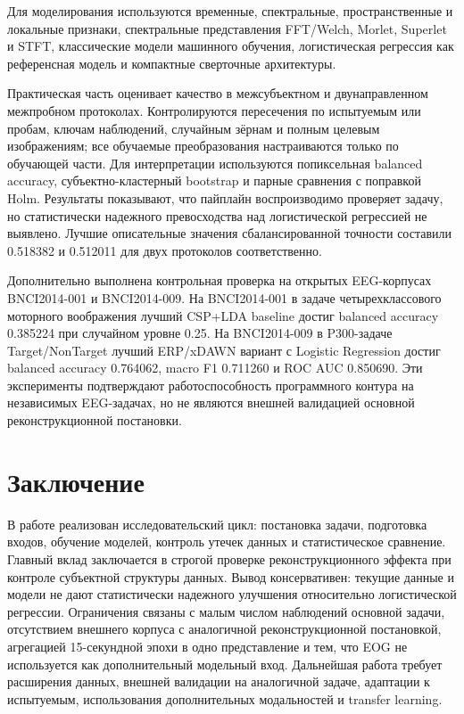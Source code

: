 \documentclass[
    14pt,
    candidate,
    times
]{disser}
\begin{document}
Для моделирования используются временные, спектральные, пространственные и
локальные признаки, спектральные представления FFT/Welch, Morlet, Superlet и
STFT, классические модели машинного обучения, логистическая регрессия как
референсная модель и компактные сверточные архитектуры.

Практическая часть оценивает качество в межсубъектном и двунаправленном
межпробном протоколах. Контролируются пересечения по испытуемым или пробам,
ключам наблюдений, случайным зёрнам и полным целевым изображениям; все
обучаемые преобразования настраиваются только по обучающей части. Для
интерпретации используются попиксельная balanced accuracy,
субъектно-кластерный bootstrap и парные сравнения с поправкой Holm. Результаты
показывают, что пайплайн воспроизводимо проверяет задачу, но статистически
надежного превосходства над логистической регрессией не выявлено. Лучшие
описательные значения сбалансированной точности составили 0.518382 и 0.512011
для двух протоколов соответственно.

Дополнительно выполнена контрольная проверка на открытых EEG-корпусах
BNCI2014-001 и BNCI2014-009. На BNCI2014-001 в задаче четырехклассового
моторного воображения лучший CSP+LDA baseline достиг balanced accuracy
0.385224 при случайном уровне 0.25. На BNCI2014-009 в P300-задаче
Target/NonTarget лучший ERP/xDAWN вариант с Logistic Regression достиг
balanced accuracy 0.764062, macro F1 0.711260 и ROC AUC 0.850690. Эти
эксперименты подтверждают работоспособность программного контура на
независимых EEG-задачах, но не являются внешней валидацией основной
реконструкционной постановки.

\section*{Заключение}

В работе реализован исследовательский цикл: постановка задачи, подготовка
входов, обучение моделей, контроль утечек данных и статистическое сравнение.
Главный вклад заключается в строгой проверке реконструкционного эффекта при
контроле субъектной структуры данных. Вывод консервативен: текущие данные и
модели не дают статистически надежного улучшения относительно логистической
регрессии. Ограничения связаны с малым числом наблюдений основной задачи,
отсутствием внешнего корпуса с аналогичной реконструкционной постановкой,
агрегацией 15-секундной эпохи в одно представление и тем, что EOG не
используется как дополнительный модельный вход. Дальнейшая работа требует
расширения данных, внешней валидации на аналогичной задаче, адаптации к
испытуемым, использования дополнительных модальностей и transfer learning.

\renewcommand{\bibsection}{%
  \section*{Список использованной литературы}
  \addcontentsline{toc}{section}{Список использованной литературы}
}


\end{document}
